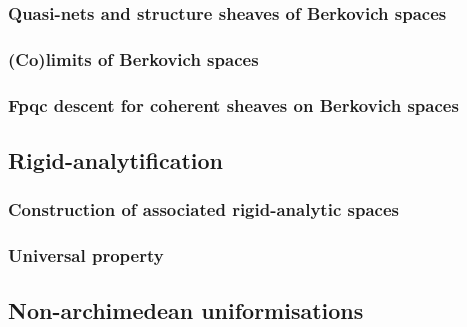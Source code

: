         \subsubsection{Quasi-nets and structure sheaves of Berkovich spaces}
        
        \subsubsection{(Co)limits of Berkovich spaces}
    
        \subsubsection{Fpqc descent for coherent sheaves on Berkovich spaces}
    
    \subsection{Rigid-analytification}
        \subsubsection{Construction of associated rigid-analytic spaces}
        
        \subsubsection{Universal property}
    
    \subsection{Non-archimedean uniformisations}